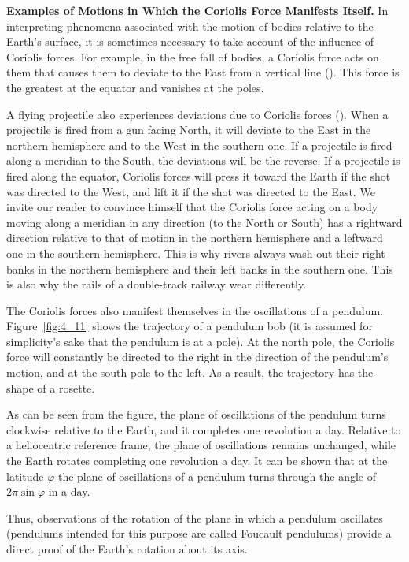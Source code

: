 \textbf{Examples of Motions in Which the Coriolis Force Manifests Itself.} In interpreting phenomena associated with the motion of bodies relative to the Earth's surface, it is sometimes necessary to take account of the influence of Coriolis forces. For example, in the free fall of bodies, a Coriolis force acts on them that causes them to deviate to the East from a vertical line (). This force is the greatest at the equator and vanishes at the poles.

A flying projectile also experiences deviations due to Coriolis forces (). When a projectile is fired from a gun facing North, it will deviate to the East in the northern hemisphere and to the West in the southern one. If a projectile is fired along a meridian to the South, the deviations will be the reverse. If a projectile is fired along the equator, Coriolis forces will press it toward the Earth if the shot was directed to the West, and lift it if the shot was directed to the East. We invite our reader to convince himself that the Coriolis force acting on a body moving along a meridian in any direction (to the North or South) has a rightward direction relative to that of motion in the northern hemisphere and a leftward one in the southern hemisphere. This is why rivers always wash out their right banks in the northern hemisphere and their left banks in the southern one. This is also why the rails of a double-track railway wear differently.

The Coriolis forces also manifest themselves in the oscillations of a pendulum. Figure~\ref{fig:4_11} shows the trajectory of a pendulum bob (it is assumed for simplicity's sake that the pendulum is at a pole). At the north pole, the Coriolis force will constantly be directed to the right in the direction of the pendulum's motion, and at the south pole to the left. As a result, the trajectory has the shape of a rosette.

As can be seen from the figure, the plane of oscillations of the pendulum turns clockwise relative to the Earth, and it completes one revolution a day. Relative to a heliocentric reference frame, the plane of oscillations remains unchanged, while the Earth rotates completing one revolution a day. It can be shown that at the latitude $\varphi$ the plane of oscillations of a pendulum turns through the angle of $2\pi\sin\varphi$ in a day.

Thus, observations of the rotation of the plane in which a pendulum oscillates (pendulums intended for this purpose are called Foucault pendulums) provide a direct proof of the Earth's rotation about its axis.

